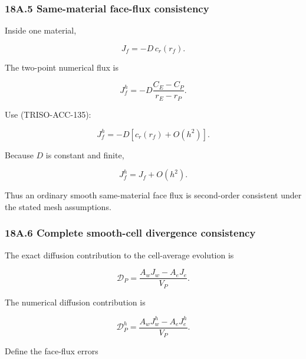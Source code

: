 \documentclass[11pt,a4paper]{article}
\begin{document}
\subsubsection*{18A.5 Same-material face-flux consistency}

Inside one material,

\begin{equation}
J_f=-D\,c_r(r_f).
\tag{TRISO-ACC-136}
\label{eq:triso-acc-136}
\end{equation}

The two-point numerical flux is

\begin{equation}
J_f^h
=
-D
\frac{C_E-C_P}{r_E-r_P}.
\tag{TRISO-ACC-137}
\label{eq:triso-acc-137}
\end{equation}

Use (TRISO-ACC-135):

\begin{equation}
J_f^h
=
-D
\left[
c_r(r_f)+O(h^2)
\right].
\tag{TRISO-ACC-138}
\label{eq:triso-acc-138}
\end{equation}

Because $D$ is constant and finite,

\begin{equation}
\boxed{
J_f^h
=
J_f
+
O(h^2).
}
\tag{TRISO-ACC-139}
\label{eq:triso-acc-139}
\end{equation}

Thus an ordinary smooth same-material face flux is second-order consistent under the stated mesh assumptions.

\subsubsection*{18A.6 Complete smooth-cell divergence consistency}

The exact diffusion contribution to the cell-average evolution is

\begin{equation}
\mathcal D_P
=
\frac{
A_wJ_w-A_eJ_e
}{
V_P
}.
\tag{TRISO-ACC-140}
\label{eq:triso-acc-140}
\end{equation}

The numerical diffusion contribution is

\begin{equation}
\mathcal D_P^h
=
\frac{
A_wJ_w^h-A_eJ_e^h
}{
V_P
}.
\tag{TRISO-ACC-141}
\label{eq:triso-acc-141}
\end{equation}

Define the face-flux errors
\end{document}
